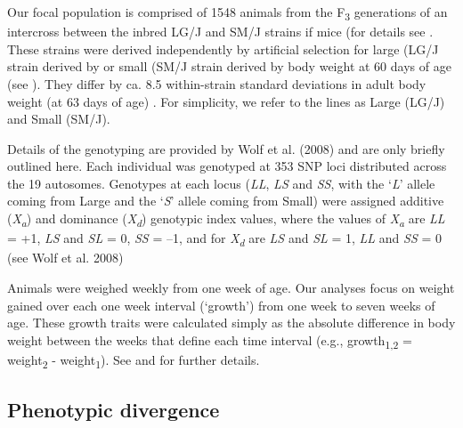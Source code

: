 \begin{refsection}
Our focal population is comprised of 1548 animals from the
F\textsubscript{3} generations of an intercross between the inbred LG/J
and SM/J strains if mice (for details see \textcite{Cheverud1996-fm,Wolf2008-cq}.
These strains were derived independently by
artificial selection for large (LG/J strain derived by \textcite{Goodale1938-an} or small
(SM/J strain derived by \textcite{MacArthur1944-ew} body weight
at 60 days of age (see  \textcite{Chai1956-fy}).
They differ by ca. 8.5 within-strain standard deviations in
adult body weight (at 63 days of age) \parencite{Kramer1998-cc}. For
simplicity, we refer to the lines as Large (LG/J) and Small (SM/J).

Details of the genotyping are provided by Wolf et al. (2008) and are
only briefly outlined here. Each individual was genotyped at 353 SNP
loci distributed across the 19 autosomes. Genotypes at each locus
(\emph{LL}, \emph{LS} and \emph{SS}, with the `\emph{L}' allele coming
from Large and the `\emph{S}' allele coming from Small) were assigned
additive (\emph{X\textsubscript{a}}) and dominance
(\emph{X\textsubscript{d}}) genotypic index values, where the values of
\emph{X\textsubscript{a}} are \emph{LL} = +1, \emph{LS} and \emph{SL} =
0, \emph{SS} = --1, and for \emph{X\textsubscript{d}} are \emph{LS} and
\emph{SL} = 1, \emph{LL} and \emph{SS} = 0 (see Wolf et al. 2008)

Animals were weighed weekly from one week of age. Our analyses focus on
weight gained over each one week interval (`growth') from one week to
seven weeks of age. These growth traits were calculated simply as the
absolute difference in body weight between the weeks that define each
time interval (e.g., growth\textsubscript{1,2} = weight\textsubscript{2}
- weight\textsubscript{1}). See \textcite{Vaughn1999-wt} and \textcite{Hager2009-mz}
 for further details.

\subsection{Phenotypic divergence}


\end{refsection}

